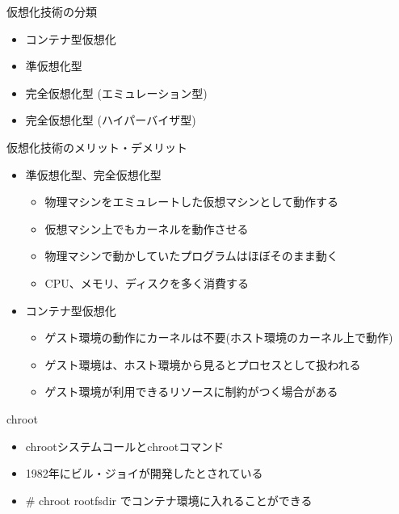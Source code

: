 
\begin{frame}[containsverbatim]{仮想化技術の分類}
  \begin{itemize}
  \item コンテナ型仮想化
  \item 準仮想化型
  \item 完全仮想化型 (エミュレーション型)
  \item 完全仮想化型 (ハイパーバイザ型)
  \end{itemize}
\end{frame}

\begin{frame}[containsverbatim]{仮想化技術のメリット・デメリット}
  \begin{itemize}
  \item 準仮想化型、完全仮想化型
    \begin{itemize}
    \item 物理マシンをエミュレートした仮想マシンとして動作する
    \item 仮想マシン上でもカーネルを動作させる
    \item 物理マシンで動かしていたプログラムはほぼそのまま動く
    \item CPU、メモリ、ディスクを多く消費する
    \end{itemize}
  \item コンテナ型仮想化
    \begin{itemize}
    \item ゲスト環境の動作にカーネルは不要(ホスト環境のカーネル上で動作)
    \item ゲスト環境は、ホスト環境から見るとプロセスとして扱われる
    \item ゲスト環境が利用できるリソースに制約がつく場合がある
    \end{itemize}
  \end{itemize}
\end{frame}

\begin{frame}[containsverbatim]{chroot}
  \begin{itemize}
  \item chrootシステムコールとchrootコマンド
  \item 1982年にビル・ジョイが開発したとされている
  \item \# chroot rootfsdir でコンテナ環境に入れることができる
  \end{itemize}
\end{frame}


